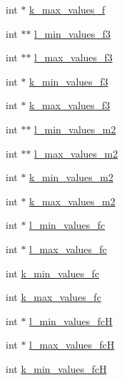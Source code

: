 \begin{DoxyCompactItemize}
int $\ast$ \mbox{\hyperlink{group__kl__neighborhood__mfe_a88bee3289b67c7d86f421670a43bf3af}{k\+\_\+max\+\_\+values\+\_\+f}}
\item 
int $\ast$$\ast$ \mbox{\hyperlink{group__kl__neighborhood__mfe_a8d646363b251672235b7c4169b71c4b0}{l\+\_\+min\+\_\+values\+\_\+f3}}
\item 
int $\ast$$\ast$ \mbox{\hyperlink{group__kl__neighborhood__mfe_a361ec8bdefe30a1046f383a5eeac4968}{l\+\_\+max\+\_\+values\+\_\+f3}}
\item 
int $\ast$ \mbox{\hyperlink{group__kl__neighborhood__mfe_ab25721e4aefc57087242f587de8e80ab}{k\+\_\+min\+\_\+values\+\_\+f3}}
\item 
int $\ast$ \mbox{\hyperlink{group__kl__neighborhood__mfe_a799795b75fefc94c7d88a04cf32dab72}{k\+\_\+max\+\_\+values\+\_\+f3}}
\item 
int $\ast$$\ast$ \mbox{\hyperlink{group__kl__neighborhood__mfe_a4253d7631384345b004bc82b8403eb77}{l\+\_\+min\+\_\+values\+\_\+m2}}
\item 
int $\ast$$\ast$ \mbox{\hyperlink{group__kl__neighborhood__mfe_a1915aa04bfdea4692bd5c3aceab74e45}{l\+\_\+max\+\_\+values\+\_\+m2}}
\item 
int $\ast$ \mbox{\hyperlink{group__kl__neighborhood__mfe_a78592d73ab65ca433ecb773a83c9b582}{k\+\_\+min\+\_\+values\+\_\+m2}}
\item 
int $\ast$ \mbox{\hyperlink{group__kl__neighborhood__mfe_ad80cc03831c345b789dad446d5e260fe}{k\+\_\+max\+\_\+values\+\_\+m2}}
\item 
int $\ast$ \mbox{\hyperlink{group__kl__neighborhood__mfe_a2852dd3d4f444b08dfebbc053cac983d}{l\+\_\+min\+\_\+values\+\_\+fc}}
\item 
int $\ast$ \mbox{\hyperlink{group__kl__neighborhood__mfe_a6debaf91b138e5e086ac6863dad01919}{l\+\_\+max\+\_\+values\+\_\+fc}}
\item 
int \mbox{\hyperlink{group__kl__neighborhood__mfe_a39ee4a1728c0d80e11c8a4694c8629d5}{k\+\_\+min\+\_\+values\+\_\+fc}}
\item 
int \mbox{\hyperlink{group__kl__neighborhood__mfe_aed3b5efc50bb9453942277f96626665f}{k\+\_\+max\+\_\+values\+\_\+fc}}
\item 
int $\ast$ \mbox{\hyperlink{group__kl__neighborhood__mfe_ac13b16138da81ff2b0c69fc4e6ab6dd4}{l\+\_\+min\+\_\+values\+\_\+fcH}}
\item 
int $\ast$ \mbox{\hyperlink{group__kl__neighborhood__mfe_a8588fe680089b986a90913bc72a7c6c8}{l\+\_\+max\+\_\+values\+\_\+fcH}}
\item 
int \mbox{\hyperlink{group__kl__neighborhood__mfe_a125e8cde969ce3347f19e825dbcec07b}{k\+\_\+min\+\_\+values\+\_\+fcH}}

\end{DoxyCompactItemize}
